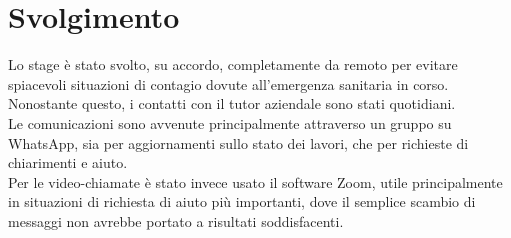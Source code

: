 \section{Svolgimento}
\label{sec:svolgimento}

Lo stage è stato svolto, su accordo, completamente da remoto per evitare spiacevoli situazioni di contagio dovute all'emergenza sanitaria in corso.\\
Nonostante questo, i contatti con il tutor aziendale sono stati quotidiani.\\
Le comunicazioni sono avvenute principalmente attraverso un gruppo su WhatsApp, sia per aggiornamenti sullo stato dei lavori, che per richieste di chiarimenti e aiuto.\\
Per le video-chiamate è stato invece usato il software Zoom, utile principalmente in situazioni di richiesta di aiuto più importanti, dove il semplice scambio di messaggi non avrebbe portato a risultati soddisfacenti.